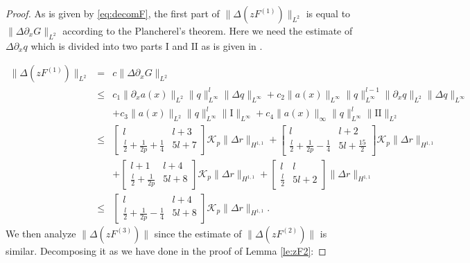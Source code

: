 \documentclass{amsart}
\theoremstyle{plain}
\theoremstyle{remark}
\numberwithin{equation}{section}
\newcommand{\Twomat}[4]
{
\left[
	\begin{array}{cc}
		{#1}	&	{#2}	\\[10pt]
		{#3}	&	{#4}
		\end{array}
\right]
}
\begin{document}
\begin{proof}
   As is given by \eqref{eq:decomF}, the first part of  $\|\Delta  (z F^{(1)})\|_{L^2}$ is equal to $\|\Delta \partial_xG\|_{L^2}$ according to the Plancherel's theorem. Here we need the estimate of  $\Delta \partial_x q$  which is divided into two parts $\textrm{I}$ and $\textrm{II}$ as is given in \cite[Lemma 5.37]{DZ-2}.

    \begin{eqnarray*}
        \|\Delta(z F^{(1)})\|_{L^2} &=& c\|\Delta \partial_xG\|_{L^2}\\
        \nonumber
        &\leq& c_1\|\partial_x a(x)\|_{L^2} \|q\|_{L^\infty}^l\|\Delta q\|_{L^\infty}+c_2\|a(x)\|_{L^\infty} \|q\|_{L^\infty}^{l-1}\|\partial_x q\|_{L^2}\|\Delta q\|_{L^\infty}\\
        \nonumber
        &&+c_3\|a(x)\|_{L^2} \|q\|_{L^\infty}^l\|\textrm{I}\|_{L^\infty}+c_4\|a(x)\|_{\infty} \|q\|_{L^\infty}^l\|\textrm{II}\|_{L^2}\\
        \nonumber
        &\leq& \Twomat{l}{l+3}{\frac{l}{2}+\frac{1}{2p}+\frac{1}{4}}{5l+7}\mathcal{K}_p\|\Delta r\|_{H^{1,1}}+\Twomat{l}{l+2}{\frac{l}{2}+\frac{1}{2p}-\frac{1}{4}}{5l+\frac{15}{2}}\mathcal{K}_p\|\Delta r\|_{H^{1,1}}\\
        \nonumber
        &&+\Twomat{l+1}{l+4}{\frac{l}{2}+\frac{1}{2p}}{5l+8}\mathcal{K}_p\|\Delta r\|_{H^{1,1}}+\Twomat{l}{l}{\frac{l}{2}}{5l+2}\|\Delta r\|_{H^{1,1}}\\
        \nonumber
        &\leq& \Twomat{l}{l+4}{\frac{l}{2}+\frac{1}{2p}-\frac{1}{4}}{5l+8}\mathcal{K}_p\|\Delta r\|_{H^{1,1}}.
    \end{eqnarray*}
 We then analyze $\|\Delta (z F^{(3)})\|$ since the estimate of $\|\Delta (z F^{(2)})\|$ is similar. Decomposing it as we have done in the proof of Lemma \ref{le:zF2}:


\end{proof}
\end{document}

